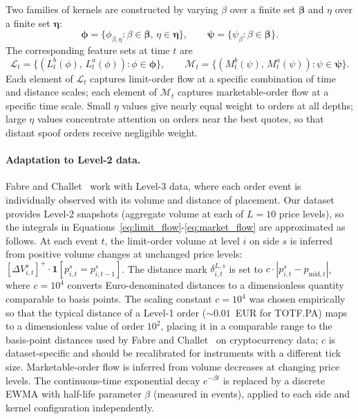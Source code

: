 \documentclass[11pt]{report}
\begin{document}
Two families of kernels are constructed by varying $\beta$ over a finite set $\boldsymbol{\beta}$ and $\eta$ over a finite set $\boldsymbol{\eta}$:
\begin{equation}
  \label{eq:kernel_families}
  \boldsymbol{\phi} = \{\phi_{\beta,\eta} : \beta \in \boldsymbol{\beta},\, \eta \in \boldsymbol{\eta}\}, \qquad
  \boldsymbol{\psi} = \{\psi_{\beta} : \beta \in \boldsymbol{\beta}\}.
\end{equation}
The corresponding feature sets at time $t$ are
\begin{equation}
  \label{eq:feature_families}
  \mathcal{L}_t = \bigl\{(L^b_t(\phi),\, L^a_t(\phi)) : \phi \in \boldsymbol{\phi}\bigr\}, \qquad
  \mathcal{M}_t = \bigl\{(M^b_t(\psi),\, M^a_t(\psi)) : \psi \in \boldsymbol{\psi}\bigr\}.
\end{equation}
Each element of $\mathcal{L}_t$ captures limit-order flow at a specific combination of time and distance scales; each element of $\mathcal{M}_t$ captures marketable-order flow at a specific time scale. Small $\eta$ values give nearly equal weight to orders at all depths; large $\eta$ values concentrate attention on orders near the best quotes, so that distant spoof orders receive negligible weight.

\paragraph{Adaptation to Level-2 data.}
Fabre and Challet~\cite{fabre_2025} work with Level-3 data, where each order event is individually observed with its volume and distance of placement. Our dataset provides Level-2 snapshots (aggregate volume at each of $L = 10$ price levels), so the integrals in Equations~\eqref{eq:limit_flow}-\eqref{eq:market_flow} are approximated as follows. At each event $t$, the limit-order volume at level $i$ on side $s$ is inferred from positive volume changes at unchanged price levels: $[\Delta V^s_{i,t}]^{+} \cdot \mathbf{1}[p^s_{i,t} = p^s_{i,t-1}]$. The distance mark $\delta^{L,s}_{i,t}$ is set to $c \cdot |p^s_{i,t} - p_{\mathrm{mid},t}|$, where $c = 10^4$ converts Euro-denominated distances to a dimensionless quantity comparable to basis points. The scaling constant $c = 10^4$ was chosen empirically so that the typical distance of a Level-1 order ($\sim 0.01$~EUR for TOTF.PA) maps to a dimensionless value of order $10^2$, placing it in a comparable range to the basis-point distances used by Fabre and Challet~\cite{fabre_2025} on cryptocurrency data; $c$ is dataset-specific and should be recalibrated for instruments with a different tick size. Marketable-order flow is inferred from volume decreases at changing price levels.
The continuous-time exponential decay $e^{-\beta t}$ is replaced by a discrete EWMA with half-life parameter $\beta$ (measured in events), applied to each side and kernel configuration independently.
\end{document}
